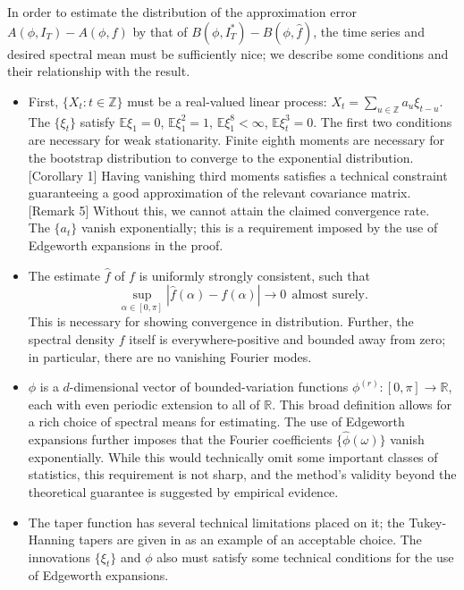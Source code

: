 In order to estimate the distribution of the approximation error $A(\phi,I_T) - A(\phi,f)$ by that of $B(\phi,I_T^*) - B(\phi,\hat f)$, the time series and desired spectral mean must be sufficiently nice; we describe some conditions and their relationship with the result. 
\begin{itemize}
\item First, $\{X_t:t\in\mathbb Z\}$ must be a real-valued linear process: $X_t = \sum_{u\in\mathbb Z} a_u \xi_{t-u}$. \\ The $\{\xi_t\}$ satisfy $\mathbb E \xi_1 = 0$, $\mathbb E \xi_1^2 = 1$, $\mathbb E \xi_1^8 <\infty$, $\mathbb E \xi_t^3 = 0$. The first two conditions are necessary for weak stationarity. Finite eighth moments are necessary for the bootstrap distribution to converge to the exponential distribution. \cite{bootstrap}[Corollary 1] Having vanishing third moments satisfies a technical constraint guaranteeing a good approximation of the relevant covariance matrix. \cite{bootstrap}[Remark 5] Without this, we cannot attain the claimed convergence rate. \\ The $\{a_t\}$ vanish exponentially; this is a requirement imposed by the use of Edgeworth expansions in the proof.
\item The estimate $\hat f$ of $f$ is uniformly strongly consistent, such that
$$
\sup_{\alpha\in[0,\pi]} |\hat f(\alpha) - f(\alpha)| \to 0 ~~\text{almost surely.}
$$
This is necessary for showing convergence in distribution. Further, the spectral density $f$ itself is everywhere-positive and bounded away from zero; in particular, there are no vanishing Fourier modes. 
\item $\phi$ is a $d$-dimensional vector of bounded-variation functions $\phi^{(r)}:[0,\pi]\to\mathbb R$, each with even periodic extension to all of $\mathbb R$. This broad definition allows for a rich choice of spectral means for estimating. The use of Edgeworth expansions further imposes that the Fourier coefficients $\{\hat \phi (\omega)\}$ vanish exponentially. While this would technically omit some important classes of statistics, this requirement is not sharp, and the method's validity beyond the theoretical guarantee is suggested by empirical evidence. 
\item The taper function has several technical limitations placed on it; the Tukey-Hanning tapers are given in \cite{bootstrap} as an example of an acceptable choice. The innovations $\{\xi_t\}$ and $\phi$ also must satisfy some technical conditions for the use of Edgeworth expansions. 
\end{itemize}

